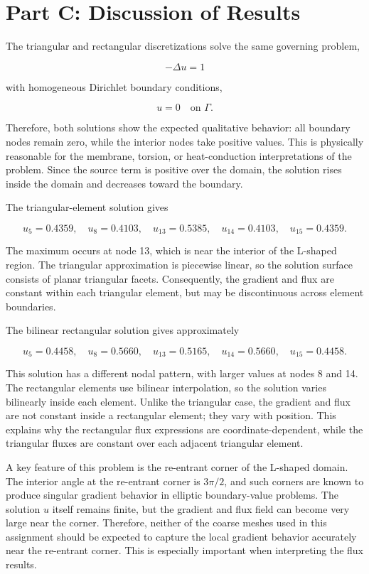 \documentclass[14pt,a4paper]{article}
\begin{document}
\section{Part C: Discussion of Results}

The triangular and rectangular discretizations solve the same governing problem,

\[
-\Delta u = 1
\]

with homogeneous Dirichlet boundary conditions,

\[
u=0 \quad \text{on } \Gamma .
\]

Therefore, both solutions show the expected qualitative behavior: all boundary nodes remain zero, while the interior nodes take positive values. This is physically reasonable for the membrane, torsion, or heat-conduction interpretations of the problem. Since the source term is positive over the domain, the solution rises inside the domain and decreases toward the boundary.

The triangular-element solution gives

\[
u_5=0.4359,\quad
u_8=0.4103,\quad
u_{13}=0.5385,\quad
u_{14}=0.4103,\quad
u_{15}=0.4359.
\]

The maximum occurs at node 13, which is near the interior of the L-shaped region. The triangular approximation is piecewise linear, so the solution surface consists of planar triangular facets. Consequently, the gradient and flux are constant within each triangular element, but may be discontinuous across element boundaries.

The bilinear rectangular solution gives approximately

\[
u_5=0.4458,\quad
u_8=0.5660,\quad
u_{13}=0.5165,\quad
u_{14}=0.5660,\quad
u_{15}=0.4458.
\]

This solution has a different nodal pattern, with larger values at nodes 8 and 14. The rectangular elements use bilinear interpolation, so the solution varies bilinearly inside each element. Unlike the triangular case, the gradient and flux are not constant inside a rectangular element; they vary with position. This explains why the rectangular flux expressions are coordinate-dependent, while the triangular fluxes are constant over each adjacent triangular element.

A key feature of this problem is the re-entrant corner of the L-shaped domain. The interior angle at the re-entrant corner is \(3\pi/2\), and such corners are known to produce singular gradient behavior in elliptic boundary-value problems. The solution \(u\) itself remains finite, but the gradient and flux field can become very large near the corner. Therefore, neither of the coarse meshes used in this assignment should be expected to capture the local gradient behavior accurately near the re-entrant corner. This is especially important when interpreting the flux results.
\end{document}
